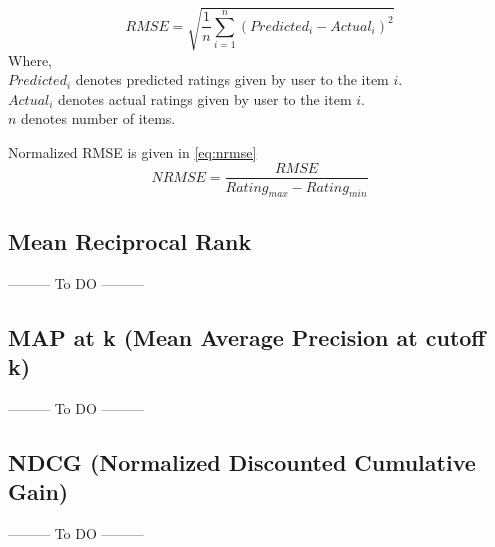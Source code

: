 \begin{equation}
RMSE = \sqrt{ \frac{1}{n} \sum_{i=1}^{n}{({Predicted_i - Actual_i} ) ^ {2}}}
\label{eq:rmse}
\end{equation}
Where, \\
$Predicted_i$ \textsf{ denotes predicted ratings given by user to the item} $i.$ \\
$Actual_i$ \textsf{ denotes actual ratings given by user to the item } $i.$ \\
$n$ \textsf{denotes number of items.}

\noindent Normalized RMSE is given in \autoref{eq:nrmse}
\begin{equation}
NRMSE = \frac{RMSE} {Rating_{max} - Rating_{min}}
\label{eq:nrmse}
\end{equation}



\subsection{Mean Reciprocal Rank}
--------- To DO ---------
\subsection{MAP at k (Mean Average Precision at cutoff k)}
--------- To DO ---------
\subsection{NDCG (Normalized Discounted Cumulative Gain)}
--------- To DO ---------